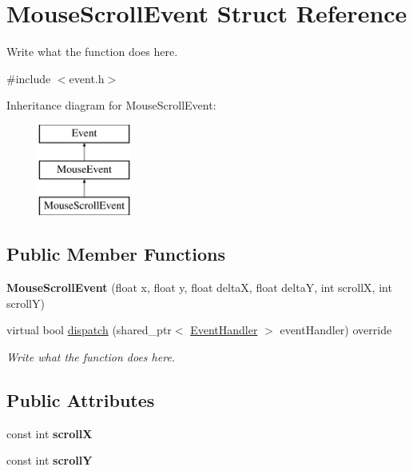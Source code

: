 \hypertarget{structMouseScrollEvent}{\section{Mouse\+Scroll\+Event Struct Reference}
\label{structMouseScrollEvent}
}


Write what the function does here.  




{\ttfamily \#include $<$event.\+h$>$}

Inheritance diagram for Mouse\+Scroll\+Event\+:\begin{figure}[H]
\begin{center}
\leavevmode
\includegraphics[height=3.000000cm]{structMouseScrollEvent}
\end{center}
\end{figure}
\subsection*{Public Member Functions}
\begin{DoxyCompactItemize}
\item 
\hypertarget{structMouseScrollEvent_a7fffc52d48bef83bcf2aea47734c3fca}{{\bfseries Mouse\+Scroll\+Event} (float x, float y, float delta\+X, float delta\+Y, int scroll\+X, int scroll\+Y)}\label{structMouseScrollEvent_a7fffc52d48bef83bcf2aea47734c3fca}

\item 
virtual bool \hyperlink{structMouseScrollEvent_acaa9673a50db8c33dd1cdbf1c5da2816}{dispatch} (shared\+\_\+ptr$<$ \hyperlink{structEventHandler}{Event\+Handler} $>$ event\+Handler) override
\begin{DoxyCompactList}\small\item\em Write what the function does here. \end{DoxyCompactList}\end{DoxyCompactItemize}
\subsection*{Public Attributes}
\begin{DoxyCompactItemize}
\item 
\hypertarget{structMouseScrollEvent_aed934d011f9c2fd1cd63f1b53bec598d}{const int {\bfseries scroll\+X}}\label{structMouseScrollEvent_aed934d011f9c2fd1cd63f1b53bec598d}

\item 
\hypertarget{structMouseScrollEvent_aefa811ca1ad2b3ef22c4423241e3ae40}{const int {\bfseries scroll\+Y}}\label{structMouseScrollEvent_aefa811ca1ad2b3ef22c4423241e3ae40}

\end{DoxyCompactItemize}
